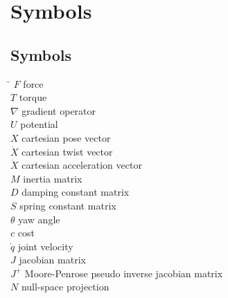 \chapter*{Symbols}
\label{sec:symbols}

\section*{Symbols}

\begin{tabbing}
 \hspace*{2.2cm} \= \kill
  $F$	 \> force \\[0.5ex]
  $T$	 \> torque \\[0.5ex]  
  $\nabla$ \> gradient operator\\[0.5ex]
  $U$ \> potential \\[0.5ex]
  $X$ \> cartesian pose vector \\[0.5ex]
  $\dot{X}$ \> cartesian twist vector \\[0.5ex]
  $\ddot{X}$ \> cartesian acceleration vector \\[0.5ex]
  $M$ \> inertia matrix \\[0.5ex]
  $D$ \> damping constant matrix \\[0.5ex]
  $S$ \>  spring constant matrix \\[0.5ex]
  $\theta$ \> yaw angle \\[0.5ex]
  $c$ \> cost \\[0.5ex]
  $\dot{q}$ \> joint velocity \\[0.5ex]
  $J$ \> jacobian matrix \\[0.5ex]
  $J^+$ \> Moore-Penrose pseudo inverse jacobian matrix \\[0.5ex]
  $N$ \> null-space projection \\[0.5ex]
  
\end{tabbing}


